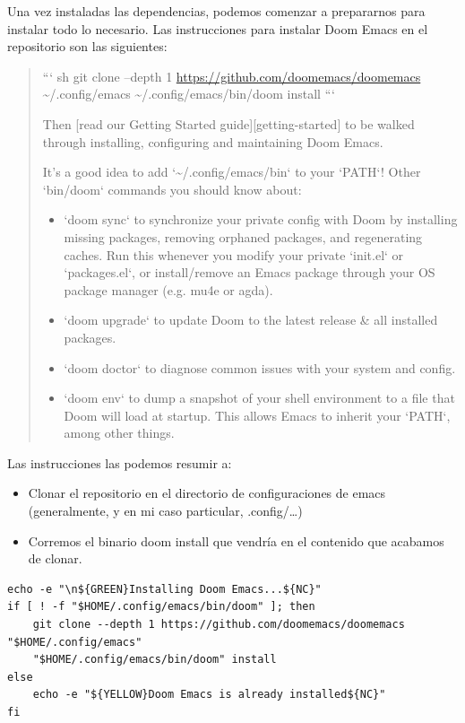 \documentclass[11pt]{article}
\begin{document}
Una vez instaladas las dependencias, podemos comenzar a prepararnos para instalar todo lo necesario. Las instrucciones para instalar Doom Emacs en el repositorio son las siguientes:
\begin{quote}
``` sh
git clone --depth 1 \url{https://github.com/doomemacs/doomemacs} \textasciitilde{}/.config/emacs
\textasciitilde{}/.config/emacs/bin/doom install
```

Then [read our Getting Started guide][getting-started] to be walked through
installing, configuring and maintaining Doom Emacs.

It's a good idea to add `\textasciitilde{}/.config/emacs/bin` to your `PATH`! Other `bin/doom`
commands you should know about:

\begin{itemize}
\item `doom sync` to synchronize your private config with Doom by installing missing
packages, removing orphaned packages, and regenerating caches. Run this
whenever you modify your private `init.el` or `packages.el`, or install/remove
an Emacs package through your OS package manager (e.g. mu4e or agda).
\item `doom upgrade` to update Doom to the latest release \& all installed packages.
\item `doom doctor` to diagnose common issues with your system and config.
\item `doom env` to dump a snapshot of your shell environment to a file that Doom
will load at startup. This allows Emacs to inherit your `PATH`, among other
things.
\end{itemize}
\end{quote}

Las instrucciones las podemos resumir a:
\begin{itemize}
\item Clonar el repositorio en el directorio de configuraciones de emacs (generalmente, y en mi caso particular, .config/\ldots{})
\item Corremos el binario doom install que vendría en el contenido que acabamos de clonar.
\end{itemize}

\begin{verbatim}
echo -e "\n${GREEN}Installing Doom Emacs...${NC}"
if [ ! -f "$HOME/.config/emacs/bin/doom" ]; then
    git clone --depth 1 https://github.com/doomemacs/doomemacs "$HOME/.config/emacs"
    "$HOME/.config/emacs/bin/doom" install
else
    echo -e "${YELLOW}Doom Emacs is already installed${NC}"
fi

\end{verbatim}
\end{document}
